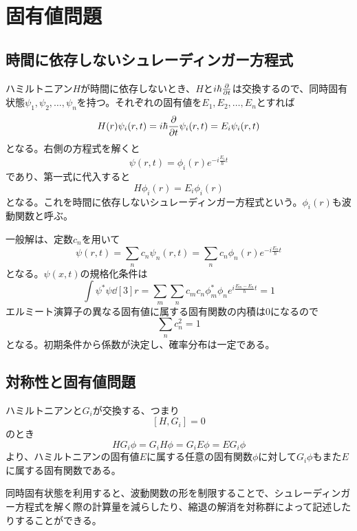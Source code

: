 \section{固有値問題}

\subsection{時間に依存しないシュレーディンガー方程式}
    ハミルトニアン$H$が時間に依存しないとき、$H$と$i\hbar\pdv{t}$は交換するので、同時固有状態$\psi_1, \psi_2, \dots, \psi_n$を持つ。それぞれの固有値を$E_1, E_2, \dots, E_n$とすれば
        \[H(r)\psi_i(r, t) = i\hbar\pdv{t}\psi_i(r, t) = E_i\psi_i(r, t)\]
    となる。右側の方程式を解くと
        \[\psi(r, t) = \phi_i(r)e^{-i\frac{E_i}{\hbar}t}\]
    であり、第一式に代入すると
        \[H\phi_i(r) = E_i\phi_i(r)\]
    となる。これを時間に依存しないシュレーディンガー方程式という。$\phi_i(r)$も波動関数と呼ぶ。
    
    一般解は、定数$c_n$を用いて
        \[\psi(r, t) = \sum_n c_n\psi_n(r, t) = \sum_n c_n\phi_n(r)e^{-i\frac{E_n}{\hbar}t}\]
    となる。$\psi(x, t)$の規格化条件は
        \[\int \psi^*\psi \dd[3]{r} = \sum_m\sum_n c_mc_n\phi_m^*\phi_n e^{i\frac{E_m - E_n}{\hbar}t} = 1\]
    エルミート演算子の異なる固有値に属する固有関数の内積は0になるので
        \[\sum_n c_n^2 = 1\]
    となる。初期条件から係数が決定し、確率分布は一定である。


\subsection{対称性と固有値問題}
    ハミルトニアンと$G_i$が交換する、つまり
        \[[H, G_i] = 0\]
    のとき
        \[HG_i\phi = G_iH\phi = G_iE\phi = EG_i\phi\]
    より、ハミルトニアンの固有値$E$に属する任意の固有関数$\phi$に対して$G_i\phi$もまた$E$に属する固有関数である。

    同時固有状態を利用すると、波動関数の形を制限することで、シュレーディンガー方程式を解く際の計算量を減らしたり、縮退の解消を対称群によって記述したりすることができる。


